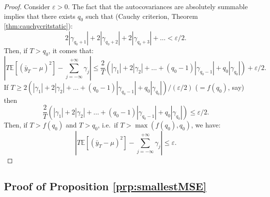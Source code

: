 \documentclass[
]{book}
\theoremstyle{definition}
\theoremstyle{definition}
\theoremstyle{definition}
\theoremstyle{definition}
\theoremstyle{remark}
\begin{document}
\begin{proof}
Consider \(\varepsilon > 0\). The fact that the autocovariances are absolutely summable implies that there exists \(q_0\) such that (Cauchy criterion, Theorem \ref{thm:cauchycritstatic}):
\[
2|\gamma_{q_0+1}|+2|\gamma_{q_0+2}|+2|\gamma_{q_0+3}|+\dots < \varepsilon/2.
\]
Then, if \(T > q_0\), it comes that:
\[
\left|T \mathbb{E}\left[(\bar{y}_T - \mu)^2\right] - \sum_{j=-\infty}^{+\infty} \gamma_j\right|\le \frac{2}{T}\left(|\gamma_1| + 2|\gamma_2| + \dots + (q_0-1)|\gamma_{q_0-1}| +q_0|\gamma_{q_0}|\right) + \varepsilon/2.
\]
If \(T \ge 2\left(|\gamma_1| + 2|\gamma_2| + \dots + (q_0-1)|\gamma_{q_0-1}| +q_0|\gamma_{q_0}|\right)/(\varepsilon/2)\) (\(= f(q_0)\), say) then
\[
\frac{2}{T}\left(|\gamma_1| + 2|\gamma_2| + \dots + (q_0-1)|\gamma_{q_0-1}| +q_0|\gamma_{q_0}|\right) \le \varepsilon/2.
\]
Then, if \(T>f(q_0)\) and \(T>q_0\), i.e.~if \(T>\max(f(q_0),q_0)\), we have:
\[
\left|T \mathbb{E}\left[(\bar{y}_T - \mu)^2\right] - \sum_{j=-\infty}^{+\infty} \gamma_j\right|\le \varepsilon.
\]
\end{proof}

\hypertarget{smallestMSE}{%
\subsection{Proof of Proposition \ref{prp:smallestMSE}}\label{smallestMSE}}
\end{document}
